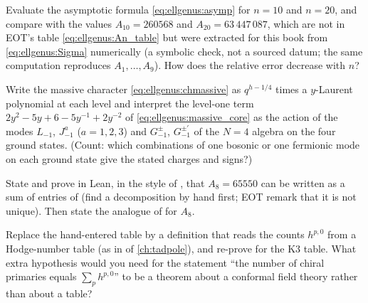 \begin{exercise}[$\star\star$]
Evaluate the asymptotic formula \eqref{eq:ellgenus:asymp} for $n=10$ and $n=20$, and
compare with the values $A_{10}=260568$ and $A_{20}=63\,447\,087$, which are not in EOT's
table \eqref{eq:ellgenus:An_table} but were extracted for this book from
\eqref{eq:ellgenus:Sigma} numerically (a symbolic check, not a sourced datum; the same
computation reproduces $A_1,\dots,A_9$). How does the relative error decrease with $n$?
\end{exercise}

\begin{exercise}[$\star\star\star$]
Write the massive character \eqref{eq:ellgenus:chmassive} as $q^{h-1/4}$ times a
$y$-Laurent polynomial at each level and interpret the level-one term
$2y^2-5y+6-5y^{-1}+2y^{-2}$ of \eqref{eq:ellgenus:massive_core} as the action of the modes
$L_{-1}$, $J^a_{-1}$ ($a=1,2,3$) and $G^{\pm}_{-1}$, $G^{\pm\prime}_{-1}$ of the $N=4$ algebra
on the four ground states. (Count: which combinations of one bosonic or one fermionic mode
on each ground state give the stated charges and signs?)
\end{exercise}

\begin{exercise}
State and prove in Lean, in the style of , that $A_8=65550$ can be
written as a sum of entries of  (find a decomposition by hand first; EOT
remark that it is not unique). Then state the analogue of  for $A_8$.
\end{exercise}

\begin{exercise}
Replace the hand-entered table  by a definition that reads the
counts $h^{p,0}$ from a Hodge-number table  (as in
 of \cref{ch:tadpole}), and re-prove
 for the K3 table. What extra hypothesis would you need for
the statement ``the number of chiral primaries equals $\sum_ph^{p,0}$'' to be a theorem
about a conformal field theory rather than about a table?
\end{exercise}

